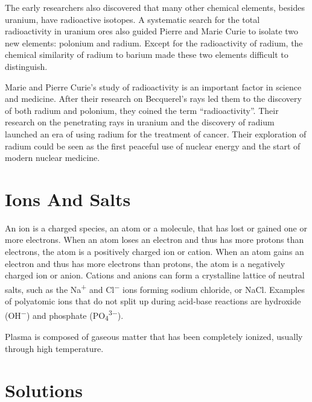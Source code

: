 The early researchers also discovered that many other chemical elements,
besides uranium, have radioactive isotopes. A systematic search for the
total radioactivity in uranium ores also guided Pierre and Marie Curie
to isolate two new elements: polonium and radium. Except for the
radioactivity of radium, the chemical similarity of radium to barium
made these two elements difficult to distinguish.

Marie and Pierre Curie's study of radioactivity is an important factor
in science and medicine. After their research on Becquerel's rays led
them to the discovery of both radium and polonium, they coined the term
``radioactivity''. Their research on the penetrating rays in uranium and
the discovery of radium launched an era of using radium for the
treatment of cancer. Their exploration of radium could be seen as the
first peaceful use of nuclear energy and the start of modern nuclear
medicine.


\hypertarget{ions-and-salts}{%
\section{Ions And Salts}\label{ions-and-salts}}

An ion is a charged species, an atom or a molecule, that has lost or gained one or more electrons. When an atom loses an electron and thus has more protons than electrons, the atom is a positively charged ion or cation. When an atom gains an electron and thus has more electrons than protons, the atom is a negatively charged ion or anion. Cations and anions can form a crystalline lattice of neutral salts, such as the Na\textsuperscript{+} and Cl\textsuperscript{−} ions forming sodium chloride, or NaCl. Examples of polyatomic ions that do not split up during acid-base reactions are hydroxide (OH\textsuperscript{−}) and phosphate (PO\textsubscript{4}\textsuperscript{3−}).

Plasma is composed of gaseous matter that has been completely ionized, usually through high temperature.

\hypertarget{solutions}{%
\section{Solutions}\label{solutions}}

